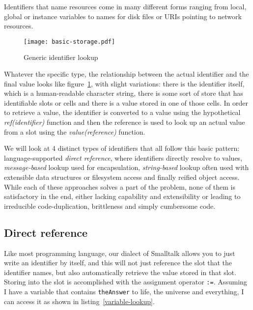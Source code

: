\documentclass[preprint,authoryear]{acm_proc_article-sp}
\begin{document}
Identifiers that name resources come in many different forms ranging from local,
global or instance variables to names for disk files or URIs pointing to network resources.

\begin{figure}[htbp]
\label{identifier-eval}
\begin{center}
\texttt{[image: basic-storage.pdf]}
\caption{Generic identifier lookup}
\end{center}
\end{figure}

Whatever the specific type, the relationship between the actual identifier and the
final value looks like figure~\ref{identifier-eval}, with slight variations:   there is
the identifier itself, which is a human-readable character string, there is some sort
of store that has identifiable slots or cells and there is a value stored in one of those
cells.   In order to retrieve a value, the identifier is converted to a value using the
hypothetical {\em ref(identifier)} function and then the reference is used to look up an actual
value from a slot using the {\em value(reference)} function.


We will look at 4 distinct types of identifiers that all follow this basic pattern:  language-supported 
{\em direct reference}, where identifiers directly resolve to values, {\em message-based} lookup
used for encapsulation,
{\em string-based} lookup often used with extensible data structures or filesystem access and
finally reified object access.   While each of these approaches solves a part of the problem,
none of them is satisfactory in the end, either lacking capability and extensibility or leading to
irreducible code-duplication, brittleness and simply cumbersome code.

\subsection{Direct reference}

Like most programming language, our dialect of Smalltalk\cite{Goldberg1983} allows you to just write 
an identifier by itself, and this will not just reference the slot that the identifier names, but also
automatically retrieve the value stored in that slot.  Storing into the slot is accomplished with
the assignment operator {\tt :=}.    Assuming I have a variable that contains {\tt theAnswer} to 
life, the universe and everything, I can access it as shown in listing~\ref{variable-lookup}.
\end{document}
